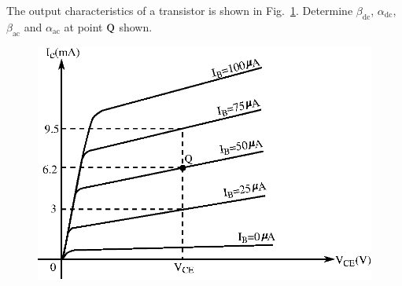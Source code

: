 \begin{problem}\label{prob2.13}
The output characteristics of a transistor is shown in Fig.~\ref{fig2.20}. Determine $\beta_{\text{dc}}$, $\alpha_{\text{dc}}$, $\beta_{\text{ac}}$ and $\alpha_{\text{ac}}$ at point $\textrm{Q}$ shown.
\begin{figure}[H]
\centering
\includegraphics{chap2/fig20.eps}
\caption{}\label{fig2.20}
\end{figure}
\end{problem}










\label{2end}
